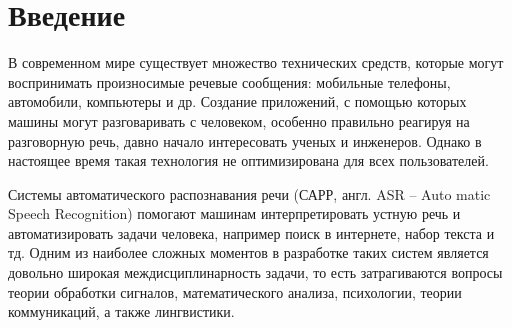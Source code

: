 \chapter*{Введение}
\setcounter{page}{2}

В современном мире существует множество технических средств, которые могут воспринимать произносимые речевые сообщения: мобильные телефоны, автомобили, компьютеры и др. Создание приложений, с помощью которых машины могут разговаривать с человеком, особенно правильно реагируя на разговорную речь, давно начало интересовать ученых и инженеров. Однако в настоящее время такая технология не оптимизирована для всех пользователей.

Системы автоматического распознавания речи (САРР, англ. ASR -- Auto matic Speech Recognition) помогают машинам интерпретировать устную речь и автоматизировать задачи человека, например поиск в интернете, набор текста и тд. Одним из наиболее сложных моментов в разработке таких систем является довольно широкая междисциплинарность задачи, то есть затрагиваются вопросы теории обработки сигналов, математического анализа, психологии, теории коммуникаций, а также лингвистики.
 
